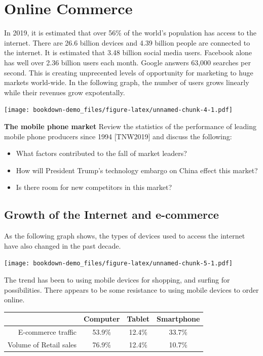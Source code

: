 \documentclass[]{book}
\providecommand{\tightlist}{%
  \setlength{\itemsep}{0pt}\setlength{\parskip}{0pt}}
\let\BeginKnitrBlock\begin \let\EndKnitrBlock\end
\begin{document}
\hypertarget{online-commerce}{%
\section{Online Commerce}\label{online-commerce}}

In 2019, it is estimated that over 56\% of the world's population has access to the internet. There are 26.6 billion devices and 4.39 billion people are connected to the internet. It is estimated that 3.48 billion social media users. Facebook alone has well over 2.36 billion users each month. Google answers 63,000 searches per second. This is creating unprecented levels of opportunity for marketing to huge markets world-wide. In the following graph, the number of users grows linearly while their revenues grow expotentally. \citep{Statista2019}

\texttt{[image: bookdown-demo\_files/figure-latex/unnamed-chunk-4-1.pdf]}

\BeginKnitrBlock{rmddiscussion}
\textbf{The mobile phone market}
Review the statistics of the performance of leading mobile phone producers since 1994 {[}TNW2019{]} and discuss the following:

\begin{itemize}
\tightlist
\item
  What factors contributed to the fall of market leaders?
\item
  How will President Trump's technology embargo on China effect this market?
\item
  Is there room for new competitors in this market?
\end{itemize}
\EndKnitrBlock{rmddiscussion}

\hypertarget{growth-of-the-internet-and-e-commerce}{%
\subsection{Growth of the Internet and e-commerce}\label{growth-of-the-internet-and-e-commerce}}

As the following graph shows, the types of devices used to access the internet have also changed in the past decade.

\texttt{[image: bookdown-demo\_files/figure-latex/unnamed-chunk-5-1.pdf]}

The trend has been to using mobile devices for shopping, and surfing for possibilities. There appears to be some resistance to using mobile devices to order online.

\begin{longtable}[]{@{}rccc@{}}
\toprule
& Computer & Tablet & Smartphone\tabularnewline
\midrule
\endhead
E-commerce traffic & 53.9\% & 12.4\% & 33.7\%\tabularnewline
Volume of Retail sales & 76.9\% & 12.4\% & 10.7\%\tabularnewline
\bottomrule
\end{longtable}
\end{document}
